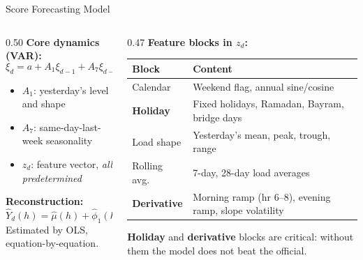 \documentclass[10pt,aspectratio=169]{beamer}
\begin{document}
\begin{frame}{Score Forecasting Model}
  \begin{columns}
    \begin{column}{0.50\textwidth}
      \textbf{Core dynamics (VAR):}
      \[
        \xi_d = a + A_1\xi_{d-1} + A_7\xi_{d-7} + Bz_d + u_d
      \]
      \begin{itemize}
        \item $A_1$: yesterday's level and shape
        \item $A_7$: same-day-last-week seasonality
        \item $z_d$: feature vector, \emph{all predetermined}
      \end{itemize}

      \vspace{0.5em}
      \textbf{Reconstruction:}
      \[
        \hat{Y}_{d}(h) = \hat\mu(h) + \hat\phi_1(h)\,\hat\xi_{d1}
                       + \hat\phi_2(h)\,\hat\xi_{d2}
      \]
      Estimated by OLS, equation-by-equation.
    \end{column}
    \begin{column}{0.47\textwidth}
      \textbf{Feature blocks in $z_d$:}
      \vspace{0.3em}
      \small
      \begin{tabular}{lp{}}
        \toprule
        Block & Content \\
        \midrule
        Calendar          & Weekend flag, annual sine/cosine \\
        \textbf{Holiday}  & Fixed holidays, Ramadan, Bayram, bridge days \\
        Load shape        & Yesterday's mean, peak, trough, range \\
        Rolling avg.      & 7-day, 28-day load averages \\
        \textbf{Derivative} & Morning ramp (hr 6--8), evening ramp, slope volatility \\
        \bottomrule
      \end{tabular}

      \vspace{0.5em}
      \small \textbf{Holiday} and \textbf{derivative} blocks are
      critical: without them the model does not beat the official.
    \end{column}
  \end{columns}
\end{frame}
\end{document}
